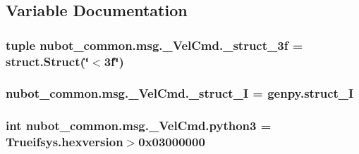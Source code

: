 \subsection{Variable Documentation}
\hypertarget{namespacenubot__common_1_1msg_1_1__VelCmd_a908ccffe79116a119d844ce4975148f8}{
\subsubsection[{\-\_\-struct\-\_\-3f}]{\setlength{\rightskip}{0pt plus 5cm}tuple nubot\-\_\-common.\-msg.\-\_\-\-Vel\-Cmd.\-\_\-struct\-\_\-3f = struct.\-Struct(\char`\"{}$<$3f\char`\"{})}}\label{namespacenubot__common_1_1msg_1_1__VelCmd_a908ccffe79116a119d844ce4975148f8}
\hypertarget{namespacenubot__common_1_1msg_1_1__VelCmd_ae6dd837722f842ce63a475878e949ff9}{
\subsubsection[{\-\_\-struct\-\_\-\-I}]{\setlength{\rightskip}{0pt plus 5cm}nubot\-\_\-common.\-msg.\-\_\-\-Vel\-Cmd.\-\_\-struct\-\_\-\-I = genpy.\-struct\-\_\-\-I}}\label{namespacenubot__common_1_1msg_1_1__VelCmd_ae6dd837722f842ce63a475878e949ff9}
\hypertarget{namespacenubot__common_1_1msg_1_1__VelCmd_aa0b9b37915905ed527cc82b6a3a73eac}{
\subsubsection[{python3}]{\setlength{\rightskip}{0pt plus 5cm}int nubot\-\_\-common.\-msg.\-\_\-\-Vel\-Cmd.\-python3 = Trueifsys.\-hexversion$>$0x03000000}}\label{namespacenubot__common_1_1msg_1_1__VelCmd_aa0b9b37915905ed527cc82b6a3a73eac}
